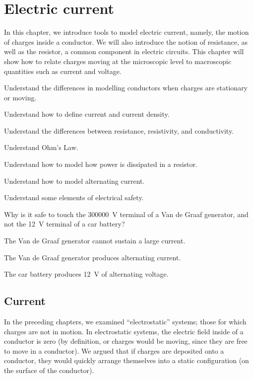 \chapter{Electric current}
\label{chapter:current}
In this chapter, we introduce tools to model electric current, namely, the motion of charges inside a conductor. We will also introduce the notion of resistance, as well as the resistor, a common component in electric circuits. This chapter will show how to relate charges moving at the microscopic level to macroscopic quantities such as current and voltage.

\begin{learningObjectives}{
 \item Understand the differences in modelling conductors when charges are stationary or moving.
 \item Understand how to define current and current density.
 \item Understand the differences between resistance, resistivity, and conductivity.
 \item Understand Ohm's Law.
 \item Understand how to model how power is dissipated in a resistor.
 \item Understand how to model alternating current.
 \item Understand some elements of electrical safety.
 }
\end{learningObjectives}

\begin{opening}
\begin{MCquestion}{Why is it safe to touch the \SI{300000}{V} terminal of a Van de Graaf generator, and not the \SI{12}{V} terminal of a car battery?}
\item The Van de Graaf generator cannot sustain a large current. \correct
\item The Van de Graaf generator produces alternating current.
\item The car battery produces \SI{12}{V} of alternating voltage.
\end{MCquestion}
\end{opening}

\section{Current}
In the preceding chapters, we examined ``electrostatic'' systems; those for which charges are not in motion. In electrostatic systems, the electric field inside of a conductor is zero (by definition, or charges would be moving, since they are free to move in a conductor). We argued that if charges are deposited onto a conductor, they would quickly arrange themselves into a static configuration (on the surface of the conductor). 

